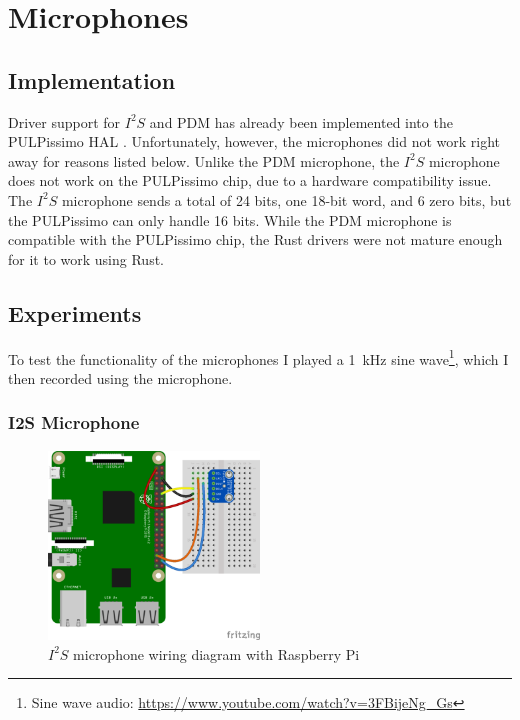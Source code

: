 

\section{Microphones}

\subsection{Implementation}

Driver support for $I^2S$ and PDM has already been implemented into the PULPissimo HAL \cite[Cha 4.3.7]{rust_pulp}.
Unfortunately, however, the microphones did not work right away for reasons listed below.
Unlike the PDM microphone, the $I^2S$ microphone does not work on the PULPissimo chip, due to a hardware compatibility issue.
The $I^2S$ microphone sends a total of 24 bits, one 18-bit word, and 6 zero bits, but the PULPissimo can only handle 16 bits.
While the PDM microphone is compatible with the PULPissimo chip, the Rust drivers were not mature enough for it to work using Rust.

\subsection{Experiments}

To test the functionality of the microphones I played a \SI{1}{\kilo\hertz} sine wave\footnote{Sine wave audio: \url{https://www.youtube.com/watch?v=3FBijeNg_Gs}},
which I then recorded using the microphone.

\subsubsection{I2S Microphone}

\begin{figure}[H]
    \centering
    \includegraphics[width=0.5\textwidth]{figures/i2s/wiring_pi.png}
    \caption[$I^2S$ microphone wiring diagram with Raspberry Pi \cite{i2s_wiring}]{$I^2S$ microphone wiring diagram with Raspberry Pi}
    \label{fig:i2s_wiring}
\end{figure}

